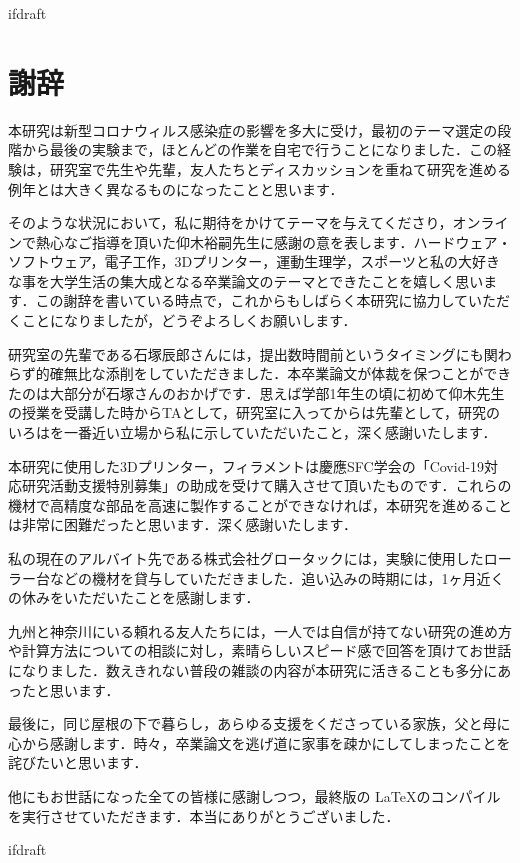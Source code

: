 \expandafter\ifx\csname ifdraft\endcsname\relax
 
\fi

\section*{謝辞}

本研究は新型コロナウィルス感染症の影響を多大に受け，最初のテーマ選定の段階から最後の実験まで，ほとんどの作業を自宅で行うことになりました．この経験は，研究室で先生や先輩，友人たちとディスカッションを重ねて研究を進める例年とは大きく異なるものになったことと思います．

そのような状況において，私に期待をかけてテーマを与えてくださり，オンラインで熱心なご指導を頂いた仰木裕嗣先生に感謝の意を表します．ハードウェア・ソフトウェア，電子工作，3Dプリンター，運動生理学，スポーツと私の大好きな事を大学生活の集大成となる卒業論文のテーマとできたことを嬉しく思います．この謝辞を書いている時点で，これからもしばらく本研究に協力していただくことになりましたが，どうぞよろしくお願いします．

研究室の先輩である石塚辰郎さんには，提出数時間前というタイミングにも関わらず的確無比な添削をしていただきました．本卒業論文が体裁を保つことができたのは大部分が石塚さんのおかげです．思えば学部1年生の頃に初めて仰木先生の授業を受講した時からTAとして，研究室に入ってからは先輩として，研究のいろはを一番近い立場から私に示していただいたこと，深く感謝いたします．

本研究に使用した3Dプリンター，フィラメントは慶應SFC学会の「Covid-19対応研究活動支援特別募集」の助成を受けて購入させて頂いたものです．これらの機材で高精度な部品を高速に製作することができなければ，本研究を進めることは非常に困難だったと思います．深く感謝いたします．

私の現在のアルバイト先である株式会社グロータックには，実験に使用したローラー台などの機材を貸与していただきました．追い込みの時期には，1ヶ月近くの休みをいただいたことを感謝します．

九州と神奈川にいる頼れる友人たちには，一人では自信が持てない研究の進め方や計算方法についての相談に対し，素晴らしいスピード感で回答を頂けてお世話になりました．数えきれない普段の雑談の内容が本研究に活きることも多分にあったと思います．

最後に，同じ屋根の下で暮らし，あらゆる支援をくださっている家族，父と母に心から感謝します．時々，卒業論文を逃げ道に家事を疎かにしてしまったことを詫びたいと思います．

他にもお世話になった全ての皆様に感謝しつつ，最終版の \LaTeX のコンパイルを実行させていただきます．本当にありがとうございました．

\expandafter\ifx\csname ifdraft\endcsname\relax
  
\fi
